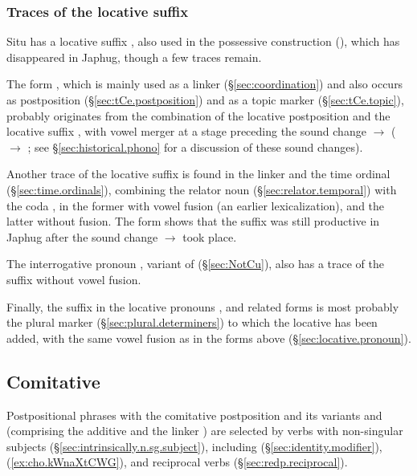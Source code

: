 \subsubsection{Traces of the locative suffix } \label{sec:locative.j}
Situ has a locative suffix , also used in the possessive construction (\citealt[325--330]{linxr93jiarong}), which has disappeared in Japhug, though a few traces remain.

The form , which is mainly used as a linker (§\ref{sec:coordination}) and also occurs as postposition (§\ref{sec:tCe.postposition}) and as a topic marker (§\ref{sec:tCe.topic}), probably originates from the combination of the locative postposition  and the locative suffix , with vowel merger at a stage preceding the sound change  $\rightarrow$   ( $\rightarrow$ ; see §\ref{sec:historical.phono} for a discussion of these sound changes).

Another trace of the locative suffix  is found in the linker  and the time ordinal  (§\ref{sec:time.ordinals}), combining the relator noun  (§\ref{sec:relator.temporal}) with the coda , in the former with vowel fusion (an earlier lexicalization), and the latter without fusion. The form    shows that the suffix  was still productive in Japhug after the sound change  $\rightarrow$  took place.

The interrogative pronoun , variant of  (§\ref{sec:NotCu}), also has a trace of the  suffix without vowel fusion.

Finally, the suffix  in the locative pronouns ,  and related forms is most probably the plural marker  (§\ref{sec:plural.determiners}) to which the locative  has been added, with the same vowel fusion as in the forms above (§\ref{sec:locative.pronoun}).

\subsection{Comitative} \label{sec:comitative} 
Postpositional phrases with the comitative postposition  and its variants  and  (comprising the additive  and the linker ) are selected by verbs with non-singular subjects (§\ref{sec:intrinsically.n.sg.subject}), including  (§\ref{sec:identity.modifier}),   (\ref{ex:cho.kWnaXtCWG}),  and reciprocal verbs (§\ref{sec:redp.reciprocal}).

